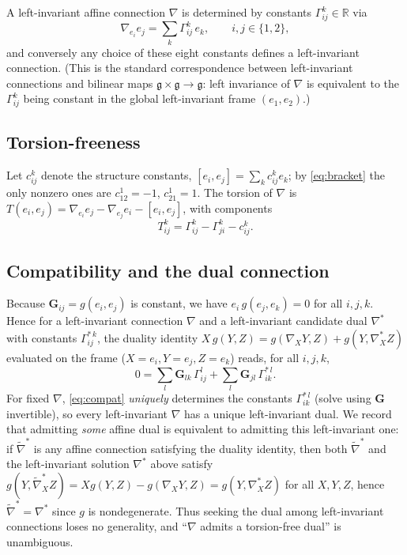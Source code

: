 \documentclass{amsart}
\theoremstyle{definition}
\theoremstyle{remark}
\begin{document}
A left-invariant affine connection $\nabla$ is determined by constants
$\Gamma^{k}_{ij}\in\mathbb{R}$ via
\[
\nabla_{e_i}e_j=\sum_{k}\Gamma^{k}_{ij}\,e_k,\qquad i,j\in\{1,2\},
\]
and conversely any choice of these eight constants defines a left-invariant connection. (This is the standard
correspondence between left-invariant connections and bilinear maps $\mathfrak g\times\mathfrak g\to\mathfrak g$:
left invariance of $\nabla$ is equivalent to the $\Gamma^k_{ij}$ being constant in the global left-invariant
frame $(e_1,e_2)$.)

\subsection*{Torsion-freeness}
Let $c^{k}_{ij}$ denote the structure constants, $[e_i,e_j]=\sum_k c^{k}_{ij}e_k$; by \eqref{eq:bracket} the only
nonzero ones are $c^{1}_{12}=-1$, $c^{1}_{21}=1$. The torsion of $\nabla$ is
$T(e_i,e_j)=\nabla_{e_i}e_j-\nabla_{e_j}e_i-[e_i,e_j]$, with components
\begin{equation}\label{eq:torsion}
T^{k}_{ij}=\Gamma^{k}_{ij}-\Gamma^{k}_{ji}-c^{k}_{ij}.
\end{equation}

\subsection*{Compatibility and the dual connection}
Because $\mathbf{G}_{ij}=g(e_i,e_j)$ is constant, we have $e_i\,g(e_j,e_k)=0$ for all $i,j,k$. Hence for a
left-invariant connection $\nabla$ and a left-invariant candidate dual $\nabla^{*}$ with constants
$\Gamma^{*\,k}_{ij}$, the duality identity
$X\,g(Y,Z)=g(\nabla_X Y,Z)+g(Y,\nabla^{*}_X Z)$ evaluated on the frame ($X=e_i,Y=e_j,Z=e_k$) reads, for all
$i,j,k$,
\begin{equation}\label{eq:compat}
0=\sum_{l}\mathbf{G}_{lk}\,\Gamma^{l}_{ij}+\sum_{l}\mathbf{G}_{jl}\,\Gamma^{*\,l}_{ik}.
\end{equation}
For fixed $\nabla$, \eqref{eq:compat} \emph{uniquely} determines the constants $\Gamma^{*\,l}_{ik}$ (solve using
$\mathbf G$ invertible), so every left-invariant $\nabla$ has a unique left-invariant dual.
We record that admitting \emph{some} affine dual is equivalent to admitting this left-invariant one: if
$\widetilde\nabla^{*}$ is any affine connection satisfying the duality identity, then both
$\widetilde\nabla^{*}$ and the left-invariant solution $\nabla^{*}$ above satisfy
$g(Y,\widetilde\nabla^{*}_XZ)=X g(Y,Z)-g(\nabla_XY,Z)=g(Y,\nabla^{*}_XZ)$ for all $X,Y,Z$, hence
$\widetilde\nabla^{*}=\nabla^{*}$ since $g$ is nondegenerate. Thus seeking the dual among left-invariant
connections loses no generality, and ``$\nabla$ admits a torsion-free dual'' is unambiguous.
\end{document}
